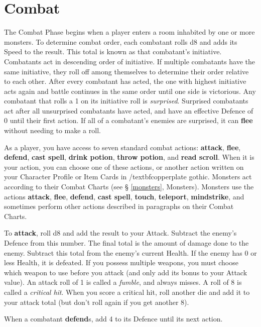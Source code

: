 \documentclass{book}
\begin{document}
\section{Combat} \label{combat}
The Combat Phase begins when a player enters a room inhabited by one or more monsters. To determine combat order, each combatant rolls d8 and adds its Speed to the result. This total is known as that combatant’s initiative. Combatants act in descending order of initiative. If multiple combatants have the same initiative, they roll off among themselves to determine their order relative to each other. After every combatant has acted, the one with highest initiative acts again and battle continues in the same order until one side is victorious.
Any combatant that rolls a 1 on its initiative roll is \emph{surprised}. Surprised combatants act after all unsurprised combatants have acted, and have an effective Defence of 0 until their first action. If all of a combatant’s enemies are surprised, it can \textbf{flee} without needing to make a roll.

As a player, you have access to seven standard combat actions: \textbf{attack}, \textbf{flee}, \textbf{defend}, \textbf{cast spell}, \textbf{drink potion}, \textbf{throw potion}, and \textbf{read scroll}. When it is your action, you can choose one of these actions, or another action written on your Character Profile or Item Cards in /textbf{copperplate gothic}.
Monsters act according to their Combat Charts (see § \ref{monsters}, Monsters). Monsters use the actions \textbf{attack}, \textbf{flee}, \textbf{defend}, \textbf{cast spell}, \textbf{touch}, \textbf{teleport}, \textbf{mindstrike}, and sometimes perform other actions described in paragraphs on their Combat Charts.

To \textbf{attack}, roll d8 and add the result to your Attack. Subtract the enemy’s Defence from this number. The final total is the amount of damage done to the enemy. Subtract this total from the enemy’s current Health. If the enemy has 0 or less Health, it is defeated. If you possess multiple weapons, you must choose which weapon to use before you attack (and only add its bonus to your Attack value).
An attack roll of 1 is called a \emph{fumble}, and always misses. A roll of 8 is called a \emph{critical hit}. When you score a critical hit, roll another die and add it to your attack total (but don’t roll again if you get another 8).

When a combatant \textbf{defend}s, add 4 to its Defence until its next action.
\end{document}
